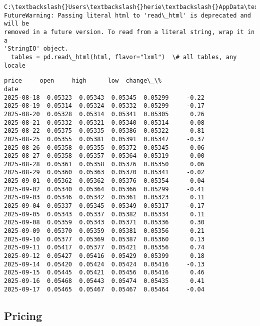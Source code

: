 \documentclass[11pt,a4paper]{article}
\makeatletter
\newcommand{\boxspacing}{\kern\kvtcb@left@rule\kern\kvtcb@boxsep}
\newcommand{\prompt}[4]{
        {\ttfamily\llap{{\color{#2}[#3]:\hspace{3pt}#4}}\vspace{-\baselineskip}}
    }
\makeatother
\begin{document}
    \begin{Verbatim}[commandchars=\\\{\}]
C:\textbackslash{}Users\textbackslash{}herie\textbackslash{}AppData\textbackslash{}Local\textbackslash{}Temp\textbackslash{}ipykernel\_27404\textbackslash{}338722890.py:11:
FutureWarning: Passing literal html to 'read\_html' is deprecated and will be
removed in a future version. To read from a literal string, wrap it in a
'StringIO' object.
  tables = pd.read\_html(html, flavor="lxml")  \# all tables, any locale
    \end{Verbatim}

            \begin{tcolorbox}[breakable, size=fbox, boxrule=.5pt, pad at break*=1mm, opacityfill=0]
\prompt{Out}{outcolor}{25}{\boxspacing}
\begin{Verbatim}[commandchars=\\\{\}]
              price     open     high      low  change\_\%
date
2025-08-18  0.05323  0.05343  0.05345  0.05299     -0.22
2025-08-19  0.05314  0.05324  0.05332  0.05299     -0.17
2025-08-20  0.05328  0.05314  0.05341  0.05305      0.26
2025-08-21  0.05332  0.05321  0.05340  0.05314      0.08
2025-08-22  0.05375  0.05335  0.05386  0.05322      0.81
2025-08-25  0.05355  0.05381  0.05391  0.05347     -0.37
2025-08-26  0.05358  0.05355  0.05372  0.05345      0.06
2025-08-27  0.05358  0.05357  0.05364  0.05319      0.00
2025-08-28  0.05361  0.05358  0.05376  0.05350      0.06
2025-08-29  0.05360  0.05363  0.05370  0.05341     -0.02
2025-09-01  0.05362  0.05362  0.05376  0.05354      0.04
2025-09-02  0.05340  0.05364  0.05366  0.05299     -0.41
2025-09-03  0.05346  0.05342  0.05361  0.05323      0.11
2025-09-04  0.05337  0.05345  0.05349  0.05317     -0.17
2025-09-05  0.05343  0.05337  0.05382  0.05334      0.11
2025-09-08  0.05359  0.05343  0.05371  0.05336      0.30
2025-09-09  0.05370  0.05359  0.05381  0.05356      0.21
2025-09-10  0.05377  0.05369  0.05387  0.05360      0.13
2025-09-11  0.05417  0.05377  0.05421  0.05356      0.74
2025-09-12  0.05427  0.05416  0.05429  0.05399      0.18
2025-09-14  0.05420  0.05424  0.05424  0.05416     -0.13
2025-09-15  0.05445  0.05421  0.05456  0.05416      0.46
2025-09-16  0.05468  0.05443  0.05474  0.05435      0.41
2025-09-17  0.05465  0.05467  0.05467  0.05464     -0.04
\end{Verbatim}
\end{tcolorbox}
        
    \hypertarget{pricing}{%
\subsection{Pricing}\label{pricing}}
\end{document}
